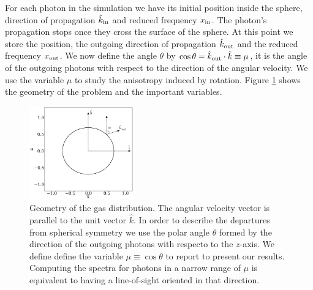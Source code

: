 \documentclass{emulateapj}
\begin{document}
For each photon in the simulation we have its initial position inside
the sphere, direction of propagation $\hat{k}_{\rm in}$ and reduced
frequency $x_{\rm in}$. The photon's propagation stops once they cross the
surface of the sphere. At this point we store the position, the outgoing direction
of propagation $\hat{k}_{\rm out}$ and the reduced frequency $x_{\rm
  out}$. We now define the angle $\theta$ by $\cos\theta = \hat{k}_{\rm out}\cdot
\hat{k}\equiv \mu$, it is the angle of the outgoing photons with 
respect to the direction of the angular velocity. We use the variable $\mu$ to
study the anisotropy induced by rotation. Figure \ref{fig:geometry}
shows the geometry of the problem and the important variables.




\begin{figure}
\begin{center}
  \includegraphics[width=0.4\textwidth]{f1.pdf}
\end{center}
\caption{Geometry of the gas distribution. The angular velocity vector
  is parallel to the unit vector $\hat{k}$. In order to describe the
  departures from spherical symmetry we use the polar angle $\theta$
  formed by the direction of the outgoing photons with respecto to the
  $z$-axis. We define define the variable $\mu\equiv\cos\theta$ to
  report to present our results. Computing the spectra for photons in
  a   narrow range of $\mu$ is equivalent to having a line-of-sight
  oriented in that direction.  
    \label{fig:geometry}}  
\end{figure}
\end{document}
